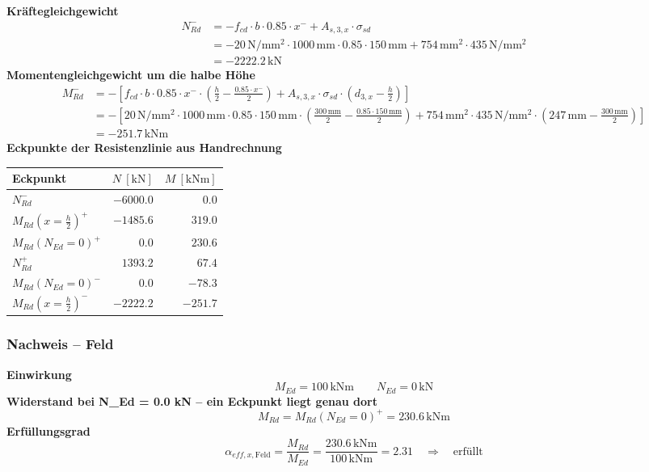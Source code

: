 \documentclass[11pt,a4paper]{article}
\begin{document}
\noindent\textbf{Kräftegleichgewicht}
\begin{equation*}
\begin{aligned}
  N_{Rd}^{-} &= -f_{cd} \cdot b \cdot 0.85 \cdot x^{-} + A_{s,3,x} \cdot \sigma_{sd} \\
  &= -20\,\mathrm{N}/\mathrm{mm}^{2} \cdot 1000\,\mathrm{mm} \cdot 0.85 \cdot 150\,\mathrm{mm} + 754\,\mathrm{mm}^{2} \cdot 435\,\mathrm{N}/\mathrm{mm}^{2} \\
  &= -2222.2\,\mathrm{kN}
\end{aligned}
\end{equation*}
\noindent\textbf{Momentengleichgewicht um die halbe Höhe}
\begin{equation*}
\begin{aligned}
  M_{Rd}^{-} &= -\left[f_{cd} \cdot b \cdot 0.85 \cdot x^{-} \cdot \left(\tfrac{h}{2} - \tfrac{0.85 \cdot x^{-}}{2}\right) + A_{s,3,x} \cdot \sigma_{sd} \cdot \left(d_{3,x} - \tfrac{h}{2}\right)\right] \\
  &= -\left[20\,\mathrm{N}/\mathrm{mm}^{2} \cdot 1000\,\mathrm{mm} \cdot 0.85 \cdot 150\,\mathrm{mm} \cdot \left(\tfrac{300\,\mathrm{mm}}{2} - \tfrac{0.85 \cdot 150\,\mathrm{mm}}{2}\right) + 754\,\mathrm{mm}^{2} \cdot 435\,\mathrm{N}/\mathrm{mm}^{2} \cdot \left(247\,\mathrm{mm} - \tfrac{300\,\mathrm{mm}}{2}\right)\right] \\
  &= -251.7\,\mathrm{kNm}
\end{aligned}
\end{equation*}
\noindent\textbf{Eckpunkte der Resistenzlinie aus Handrechnung}
\begin{longtable}{lrr}
\hline
Eckpunkt & $N\ [\mathrm{kN}]$ & $M\ [\mathrm{kNm}]$ \\
\hline
\endhead
$N_{Rd}^{-}$ & $-6000.0$ & $0.0$ \\
$M_{Rd}(x=\tfrac{h}{2})^{+}$ & $-1485.6$ & $319.0$ \\
$M_{Rd}(N_{Ed}=0)^{+}$ & $0.0$ & $230.6$ \\
$N_{Rd}^{+}$ & $1393.2$ & $67.4$ \\
$M_{Rd}(N_{Ed}=0)^{-}$ & $0.0$ & $-78.3$ \\
$M_{Rd}(x=\tfrac{h}{2})^{-}$ & $-2222.2$ & $-251.7$ \\
\hline
\end{longtable}
\subsubsection{Nachweis – Feld}
\noindent\textbf{Einwirkung}
\begin{equation*}
M_{Ed} = 100\,\mathrm{kNm} \qquad N_{Ed} = 0\,\mathrm{kN}
\end{equation*}
\noindent\textbf{Widerstand bei N\_Ed = 0.0 kN – ein Eckpunkt liegt genau dort}
\begin{equation*}
M_{Rd} = M_{Rd}(N_{Ed}=0)^{+} = 230.6\,\mathrm{kNm}
\end{equation*}
\noindent\textbf{Erfüllungsgrad}
\begin{equation*}
\alpha_{eff,x,\text{Feld}} = \frac{M_{Rd}}{M_{Ed}} = \frac{230.6\,\mathrm{kNm}}{100\,\mathrm{kNm}} = 2.31 \quad \Rightarrow \quad \text{erfüllt}
\end{equation*}
\end{document}
